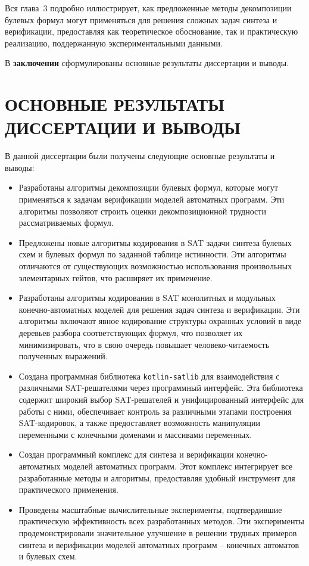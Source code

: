 Вся глава~3 подробно иллюстрирует, как предложенные методы декомпозиции булевых формул могут применяться для решения сложных задач синтеза и верификации, предоставляя как теоретическое обоснование, так и практическую реализацию, поддержанную экспериментальными данными.


В \textbf{заключении} сформулированы основные результаты диссертации и выводы.


\section*{ОСНОВНЫЕ РЕЗУЛЬТАТЫ ДИССЕРТАЦИИ И ВЫВОДЫ}

В данной диссертации были получены следующие основные результаты и выводы:
\begin{itemize}[beginpenalty=10000]
    \item Разработаны алгоритмы декомпозиции булевых формул, которые могут применяться к задачам верификации моделей автоматных программ. Эти алгоритмы позволяют строить оценки декомпозиционной трудности рассматриваемых формул.

    \item Предложены новые алгоритмы кодирования в SAT задачи синтеза булевых схем и булевых формул по заданной таблице истинности. Эти алгоритмы отличаются от существующих возможностью использования произвольных элементарных гейтов, что расширяет их применение.

    \item Разработаны алгоритмы кодирования в SAT монолитных и модульных конечно-автоматных моделей для решения задач синтеза и верификации. Эти алгоритмы включают явное кодирование структуры охранных условий в виде деревьев разбора соответствующих формул, что позволяет их минимизировать, что в свою очередь повышает человеко-читаемость полученных выражений.

    \item Создана программная библиотека \texttt{kotlin-satlib} для взаимодействия с различными SAT-решателями через программный интерфейс. Эта библиотека содержит широкий выбор SAT-решателей и унифицированный интерфейс для работы с ними, обеспечивает контроль за различными этапами построения SAT-кодировок, а также предоставляет возможность манипуляции переменными с конечными доменами и массивами переменных.

    \item Создан программный комплекс  для синтеза и верификации конечно-автоматных моделей автоматных программ. Этот комплекс интегрирует все разработанные методы и алгоритмы, предоставляя удобный инструмент для практического применения.

    \item Проведены масштабные вычислительные эксперименты, подтвердившие практическую эффективность всех разработанных методов. Эти эксперименты продемонстрировали значительное улучшение в решении трудных примеров синтеза и верификации моделей автоматных программ \--- конечных автоматов и булевых схем.
\end{itemize}

